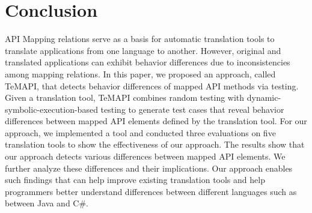 \section{Conclusion}
\label{sec:conclusion}

API Mapping relations serve as a basis for automatic translation tools to translate applications from one language to another. However, original and translated applications can exhibit behavior differences due to inconsistencies among mapping relations. In this paper, we proposed an approach, called TeMAPI, that detects behavior differences of mapped API methods via testing. Given a translation tool, TeMAPI combines random testing with dynamic-symbolic-execution-based testing to generate test cases that reveal behavior differences between mapped API elements defined by the translation tool. For our approach, we implemented a tool and conducted three evaluations on five translation tools to show the effectiveness of our approach. The results show that our approach detects various differences between mapped API elements. We further analyze these differences and their implications. Our approach enables such findings that can help improve existing translation tools and help programmers better understand differences between different languages such as between Java and C\#.


